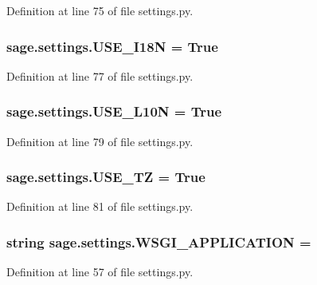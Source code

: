 Definition at line 75 of file settings.\+py.

\hypertarget{namespacesage_1_1settings_acf5dd02a352695a98f57bef7679a29af}{}
\subsubsection[{U\+S\+E\+\_\+\+I18\+N}]{\setlength{\rightskip}{0pt plus 5cm}sage.\+settings.\+U\+S\+E\+\_\+\+I18\+N = True}\label{namespacesage_1_1settings_acf5dd02a352695a98f57bef7679a29af}


Definition at line 77 of file settings.\+py.

\hypertarget{namespacesage_1_1settings_a9d0e7298d4688c99e0ee9e965d950de0}{}
\subsubsection[{U\+S\+E\+\_\+\+L10\+N}]{\setlength{\rightskip}{0pt plus 5cm}sage.\+settings.\+U\+S\+E\+\_\+\+L10\+N = True}\label{namespacesage_1_1settings_a9d0e7298d4688c99e0ee9e965d950de0}


Definition at line 79 of file settings.\+py.

\hypertarget{namespacesage_1_1settings_aa385f778cd7bd79cc4c688fec7c101a2}{}
\subsubsection[{U\+S\+E\+\_\+\+T\+Z}]{\setlength{\rightskip}{0pt plus 5cm}sage.\+settings.\+U\+S\+E\+\_\+\+T\+Z = True}\label{namespacesage_1_1settings_aa385f778cd7bd79cc4c688fec7c101a2}


Definition at line 81 of file settings.\+py.

\hypertarget{namespacesage_1_1settings_a700b653427cc28bc1ebe951b419cfd58}{}
\subsubsection[{W\+S\+G\+I\+\_\+\+A\+P\+P\+L\+I\+C\+A\+T\+I\+O\+N}]{\setlength{\rightskip}{0pt plus 5cm}string sage.\+settings.\+W\+S\+G\+I\+\_\+\+A\+P\+P\+L\+I\+C\+A\+T\+I\+O\+N = \textquotesingle{}}\label{namespacesage_1_1settings_a700b653427cc28bc1ebe951b419cfd58}


Definition at line 57 of file settings.\+py.

